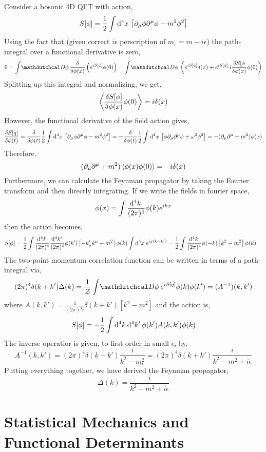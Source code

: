 \documentclass[12pt]{article}
\begin{document}
Consider a bosonic 4D QFT with action,
\[ S[\phi] = \frac{1}{2} \int \mathrm{d}^{4} x \: \left[ \partial_\mu \phi \partial^\mu \phi - m^2 \phi^2 \right] \]
Using the fact that (given correct $i \epsilon$ perscription of $m_{\epsilon} = m - i \epsilon$) the path-integral over a functional derivative is zero,
\begin{align*}
0 = \int \pathd{\phi} \fderiv{}{\phi(x)} \left( e^{i S[\phi]} \phi(0) \right) = \int \pathd{\phi} \left( e^{i S[\phi]} \delta(x) + e^{i S[\phi]} \: i \fderiv{S[\phi}{\phi(x)} \phi(0) \right)
\end{align*}
Splitting up this integral and normalizing, we get,
\[ \left< \frac{\delta S[\phi]}{\delta \phi(x)} \phi(0) \right> = i \delta(x) \]
However, the functional derivative of the field action gives,
\[ \frac{\delta S[q]}{\delta \phi(t)} = \frac{\delta }{\delta \phi(t)} \frac{1}{2} \int \mathrm{d}^{4} x \: \left[ \partial_\mu \phi \partial^\mu \phi - m^2 \phi^2 \right] = - \frac{\delta }{\delta \phi(t)} \frac{1}{2} \int \mathrm{d}^{4} x \: \left[ \phi \partial_\mu \partial^\mu \phi + \omega^2 \phi^2 \right] = - (\partial_\mu \partial^\mu + m^2) \phi(x) \]
Therefore,
\[ (\partial_\mu \partial^\mu + m^2) \left< \phi(x) \phi(0) \right> = -i \delta(x) \]
Furthermore, we can calculate the Feynman propagator by taking the Fourier transform and then directly integrating. If we write the fields in fourier space,
\[ \phi(x) = \int \frac{\mathrm{d}^{4} k \:}{(2 \pi)^4} \phi(k) e^{i k x} \]
then the action becomes,
\begin{align*}
S[\phi] & = \frac{1}{2} \int \frac{\mathrm{d}^{4} k \:}{(2 \pi)^4} \frac{\mathrm{d}^{4} k' \:}{(2 \pi)^4} \phi(k') \left[ - k'_\mu k^\mu - m^2 \right] \phi(k) \int \mathrm{d}^{4} x \: e^{i x (k + k') } = \frac{1}{2} \int \frac{\mathrm{d}^{4} k \:}{(2 \pi)^4} \phi(-k) \left[ k^2 - m^2 \right] \phi(k) 
\end{align*}
The two-point momentum correlation function can be written in terms of a path-integral via,
\[ (2 \pi)^4 \delta(k + k') \Delta(k) = \frac{1}{\Znorm} \int \pathd{\phi} e^{i S[q]} \phi(k) \phi(k') = (A^{-1})(k, k') \]
where $A(k,k') = \frac{1}{(2 \pi)^4 i} \delta(k + k') \left[k^2 - m^2 \right]$ and the action is,
\[ S[\phi] = - \frac{1}{2} \int \mathrm{d}^{4} k \: \mathrm{d}^{4} k' \: \phi(k') A(k,k') \phi(k) \] The inverse operatior is given, to first order in small $\epsilon$, by,
\[ A^{-1}(k, k') = (2 \pi)^4 \delta(k + k') \frac{i}{k^2 - m_{\epsilon}^2} = (2 \pi)^4 \delta(k + k') \frac{i}{k^2 - m^2 + i \epsilon} \]
Putting everything together, we have derived the Feynman propagator,
\[ \Delta(k) = \frac{i}{k^2 - m^2 + i \epsilon} \]  

\section{Statistical Mechanics and Functional Determinants}
\end{document}
